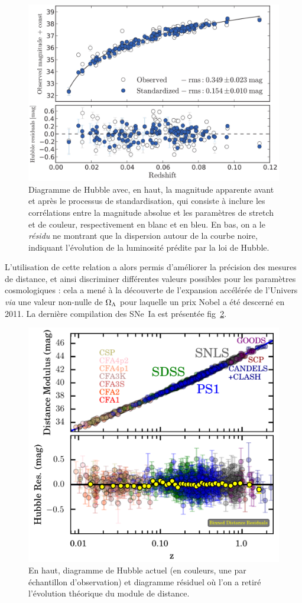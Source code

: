 \documentclass[a4paper, 12pt, svgnames]{article}
\begin{document}
\begin{figure}[htbp!]
    \centering
    \includegraphics[width=.5\linewidth]{Rapport_figures/disp_beau.png}
    \captionsetup{justification=centering}
    \caption{Diagramme de Hubble avec, en haut, la magnitude apparente avant et
        après le processus de standardisation, qui consiste à inclure les
        corrélations entre la magnitude absolue et les paramètres de stretch et
        de couleur, respectivement en blanc et en bleu. En bas, on a le
        \textit{résidu} ne montrant que la dispersion autour de la courbe noire,
        indiquant l'évolution de la luminosité prédite par la loi de Hubble.}
    \label{disp_20}
\end{figure}

L'utilisation de cette relation a alors permis d'améliorer la précision des
mesures de distance, et ainsi discriminer différentes valeurs possibles pour les
paramètres cosmologiques : cela a mené à la découverte de l'expansion accélérée
de l'Univers \textit{via} une valeur non-nulle de $\Omega_\Lambda$ pour laquelle un prix
Nobel a été descerné en 2011. La dernière compilation des SNe~Ia est
présentée fig~\ref{fig:hub_current}.

\begin{figure}[htbp!]
    \centering
    \includegraphics[width=.5\linewidth]{Rapport_figures/hub_current.png}
    \captionsetup{justification=centering}
    \caption{En haut, diagramme de Hubble actuel (en couleurs, une par
             échantillon d'observation) et diagramme résiduel où l'on a retiré
             l'évolution théorique du module de distance.
             \cite{scolnic_complete_2018}}
    \label{fig:hub_current}
\end{figure}
\end{document}
